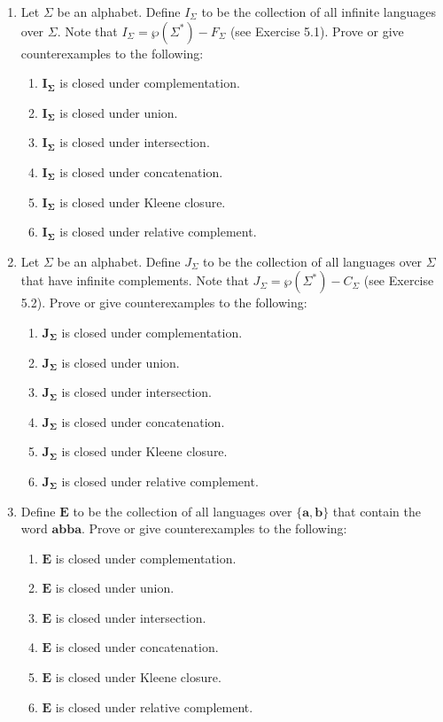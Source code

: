 \begin{enumerate}[{5.}1. ]
\item Let $\Sigma$ be an alphabet. Define $I_\Sigma$ to be the collection of all
infinite languages over $\Sigma$. Note that $I_\Sigma=\wp(\Sigma^*)-F_\Sigma$
(see Exercise 5.1). Prove or give counterexamples to the following:
\begin{enumerate}
\item $\pmb{I_\Sigma}$ is closed under complementation.
\item $\pmb{I_\Sigma}$ is closed under union.
\item $\pmb{I_\Sigma}$ is closed under intersection.
\item $\pmb{I_\Sigma}$ is closed under concatenation.
\item $\pmb{I_\Sigma}$ is closed under Kleene closure.
\item $\pmb{I_\Sigma}$ is closed under relative complement.
\end{enumerate}

\item Let $\Sigma$ be an alphabet. Define $J_\Sigma$ to be the collection of all
languages over $\Sigma$ that have infinite complements. Note that
$J_\Sigma=\wp(\Sigma^*)-C_\Sigma$ (see Exercise 5.2). Prove or give
counterexamples to the following:
\begin{enumerate}
\item $\pmb{J_\Sigma}$ is closed under complementation.
\item $\pmb{J_\Sigma}$ is closed under union.
\item $\pmb{J_\Sigma}$ is closed under intersection.
\item $\pmb{J_\Sigma}$ is closed under concatenation.
\item $\pmb{J_\Sigma}$ is closed under Kleene closure.
\item $\pmb{J_\Sigma}$ is closed under relative complement.
\end{enumerate}

\item Define $\pmb{E}$ to be the collection of all
languages over $\{\pmb{a},\pmb{b}\}$ that contain the word $\pmb{abba}$. Prove or
give counterexamples to the following:
\begin{enumerate}
\item $\pmb{E}$ is closed under complementation.
\item $\pmb{E}$ is closed under union.
\item $\pmb{E}$ is closed under intersection.
\item $\pmb{E}$ is closed under concatenation.
\item $\pmb{E}$ is closed under Kleene closure.
\item $\pmb{E}$ is closed under relative complement.
\end{enumerate}


\end{enumerate}
